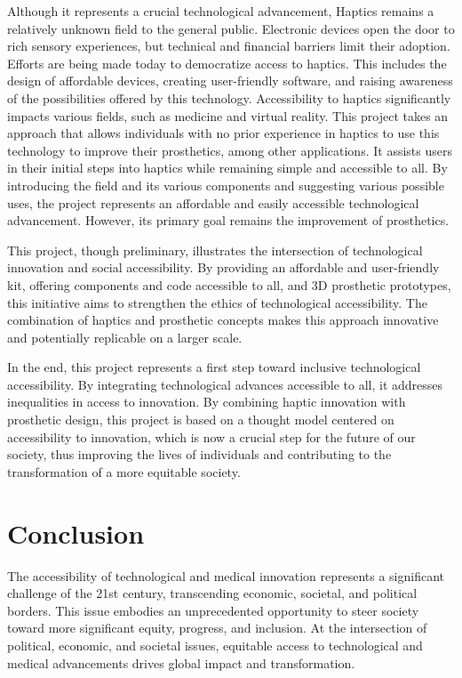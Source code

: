 Although it represents a crucial technological advancement, Haptics remains a relatively unknown field to the general public. Electronic devices open the door to rich sensory experiences, but technical and financial barriers limit their adoption. Efforts are being made today to democratize access to haptics. This includes the design of affordable devices, creating user-friendly software, and raising awareness of the possibilities offered by this technology. Accessibility to haptics significantly impacts various fields, such as medicine and virtual reality. This project takes an approach that allows individuals with no prior experience in haptics to use this technology to improve their prosthetics, among other applications. It assists users in their initial steps into haptics while remaining simple and accessible to all. By introducing the field and its various components and suggesting various possible uses, the project represents an affordable and easily accessible technological advancement. However, its primary goal remains the improvement of prosthetics.

This project, though preliminary, illustrates the intersection of technological innovation and social accessibility. By providing an affordable and user-friendly kit, offering components and code accessible to all, and 3D prosthetic prototypes, this initiative aims to strengthen the ethics of technological accessibility. The combination of haptics and prosthetic concepts makes this approach innovative and potentially replicable on a larger scale.

In the end, this project represents a first step toward inclusive technological accessibility. By integrating technological advances accessible to all, it addresses inequalities in access to innovation. By combining haptic innovation with prosthetic design, this project is based on a thought model centered on accessibility to innovation, which is now a crucial step for the future of our society, thus improving the lives of individuals and contributing to the transformation of a more equitable society.

\section{Conclusion}
The accessibility of technological and medical innovation represents a significant challenge of the 21st century, transcending economic, societal, and political borders. This issue embodies an unprecedented opportunity to steer society toward more significant equity, progress, and inclusion. At the intersection of political, economic, and societal issues, equitable access to technological and medical advancements drives global impact and transformation.


